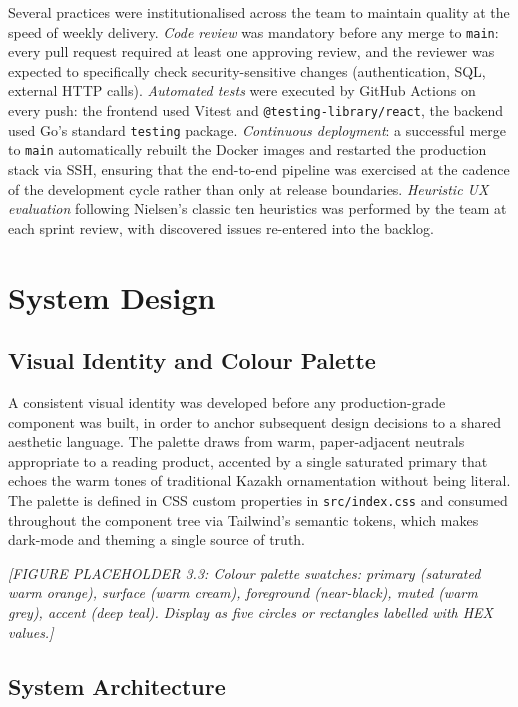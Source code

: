 \documentclass[12pt,a4paper]{report}
\begin{document}
Several practices were institutionalised across the team to maintain
quality at the speed of weekly delivery. \textit{Code review} was
mandatory before any merge to \texttt{main}: every pull request required
at least one approving review, and the reviewer was expected to
specifically check security-sensitive changes (authentication, SQL,
external HTTP calls). \textit{Automated tests} were executed by GitHub
Actions on every push: the frontend used Vitest and
\texttt{@testing-library/react}, the backend used Go's standard
\texttt{testing} package. \textit{Continuous deployment}: a successful
merge to \texttt{main} automatically rebuilt the Docker images and
restarted the production stack via SSH, ensuring that the end-to-end
pipeline was exercised at the cadence of the development cycle rather
than only at release boundaries. \textit{Heuristic UX evaluation}
following Nielsen's classic ten heuristics \cite{nielsen1994} was
performed by the team at each sprint review, with discovered issues
re-entered into the backlog.

\section{System Design}

\subsection{Visual Identity and Colour Palette}

A consistent visual identity was developed before any production-grade
component was built, in order to anchor subsequent design decisions to a
shared aesthetic language. The palette draws from warm, paper-adjacent
neutrals appropriate to a reading product, accented by a single saturated
primary that echoes the warm tones of traditional Kazakh ornamentation
without being literal. The palette is defined in CSS custom properties in
\texttt{src/index.css} and consumed throughout the component tree via
Tailwind's semantic tokens, which makes dark-mode and theming a single
source of truth.

\textit{[FIGURE PLACEHOLDER 3.3: Colour palette swatches: primary
(saturated warm orange), surface (warm cream), foreground (near-black),
muted (warm grey), accent (deep teal). Display as five circles or
rectangles labelled with HEX values.]}

\subsection{System Architecture}
\end{document}
